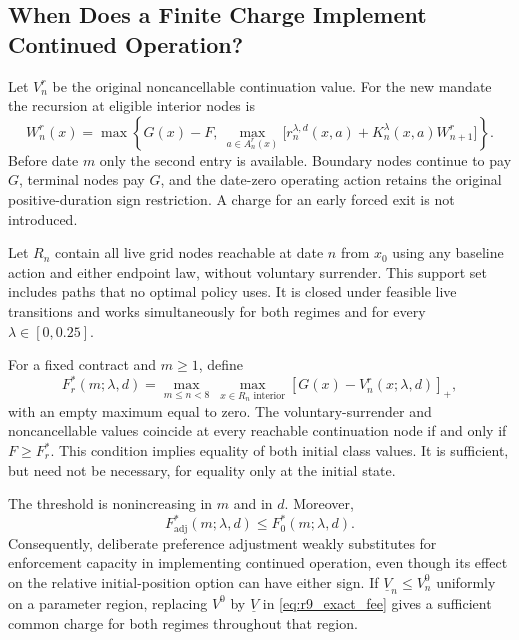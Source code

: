 \subsection{When Does a Finite Charge Implement Continued Operation?}
\label{subsec:r9_enforcement}
Let $V^r_n$ be the original noncancellable continuation value. For the new mandate the recursion at eligible interior nodes is
\begin{equation}
 W^r_n(x)=\max\left\{G(x)-F,\ \max_{a\in A^r_n(x)}
          \bigl[r^{\lambda,d}_n(x,a)+K^\lambda_n(x,a)W^r_{n+1}\bigr]\right\}.
 \label{eq:r9_stopping}
\end{equation}
Before date $m$ only the second entry is available. Boundary nodes continue to pay $G$, terminal nodes pay $G$, and the date-zero operating action retains the original positive-duration sign restriction. A charge for an early forced exit is not introduced.

Let $R_n$ contain all live grid nodes reachable at date $n$ from $x_0$ using any baseline action and either endpoint law, without voluntary surrender. This support set includes paths that no optimal policy uses. It is closed under feasible live transitions and works simultaneously for both regimes and for every $\lambda\in[0,0.25]$.

\begin{proposition}
\label{prop:r9_enforcement}
For a fixed contract and $m\geq1$, define
\begin{equation}
 F_r^*(m;\lambda,d)=
 \max_{m\leq n<8}\ \max_{x\in R_n\text{ interior}}[G(x)-V^r_n(x;\lambda,d)]_+,
 \label{eq:r9_exact_fee}
\end{equation}
with an empty maximum equal to zero. The voluntary-surrender and noncancellable values coincide at every reachable continuation node if and only if $F\geq F_r^*$. This condition implies equality of both initial class values. It is sufficient, but need not be necessary, for equality only at the initial state.

The threshold is nonincreasing in $m$ and in $d$. Moreover,
\begin{equation}
 F_{\mathrm{adj}}^*(m;\lambda,d)\leq F_0^*(m;\lambda,d).
 \label{eq:r9_capacity_substitute}
\end{equation}
Consequently, deliberate preference adjustment weakly substitutes for enforcement capacity in implementing continued operation, even though its effect on the relative initial-position option can have either sign. If $\underline V_n\leq V^0_n$ uniformly on a parameter region, replacing $V^0$ by $\underline V$ in \eqref{eq:r9_exact_fee} gives a sufficient common charge for both regimes throughout that region.
\end{proposition}

